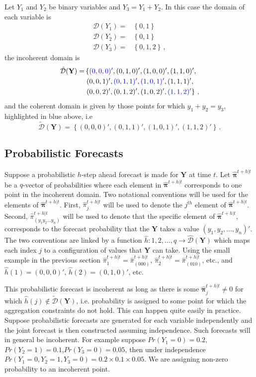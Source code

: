 \documentclass[a4paper,review,12pt,authoryear]{elsarticle}
\newcommand{\bY}{\mathbf{Y}}
\newcommand{\bpi}{\bm{\pi}}
\begin{document}
    Let $Y_1$ and $Y_2$ be binary variables and $Y_3=Y_1+Y_2$. In this case the domain of each variable is
    \begin{align*}
      \mathcal{D}(Y_1)=&\left\{0,1\right\}\\
      \mathcal{D}(Y_2)=&\left\{0,1\right\}\\
      \mathcal{D}(Y_3)=&\left\{0,1,2\right\}\,,
    \end{align*}	
    the incoherent domain is
    \begin{align*}
    \hat{\mathcal D}(\bY)=&\left\{\textcolor{blue}{(0,0,0)'},(0,1,0)',(1,0,0)',(1,1,0)',\right.\\
    &\left.(0,0,1)',\textcolor{blue}{(0,1,1)'},\textcolor{blue}{(1,0,1)'},(1,1,1)',\right.\\
    &\left.(0,0,2)',(0,1,2)',(1,0,2)',\textcolor{blue}{(1,1,2)'}\right\}\,,
    \end{align*}
    and the coherent domain is given by those points for which $y_1+y_2=y_3$, highlighted in blue above, i.e
    \[
        \tilde{\mathcal D}(\bY)=\left\{(0,0,0)',(0,1,1)',(1,0,1)',(1,1,2)'\right\}\,.
    \]
    
    \subsection{Probabilistic Forecasts}

    Suppose a probabilistic $h$-step ahead forecast is made for $\bY$ at time $t$. Let $\hat{\bpi}^{t+h|t}$ be a $q$-vector of probabilities where each element in $\hat{\bpi}^{t+h|t}$ corresponds to one point in the incoherent domain. Two notational conventions will be used for the elements of $\hat{\bpi}^{t+h|t}$. First, $\hat{\pi}_j^{t+h|t}$ will be used to denote the $j^{th}$ element of $\hat{\bpi}^{t+h|t}$.  Second, $\hat{\pi}_{(y_1 y_2 \dots y_n)}^{t+h|t}$ will be used to denote that the specific element of $\hat{\bpi}^{t+h|t}$, corresponds to the forecast probability that the $\bY$ takes a value $(y_1,y_2,\dots,y_n)'$. The two conventions are linked by a function $\hat{h}:{1,2,\dots,q}\rightarrow\hat{\mathcal{D}}(\bY)$ which maps each index $j$ to a configuration of values that $\bY$ can take. Using the small example in the previous section $\hat{\pi}_1^{t+h|t}=\hat{\pi}_{(000)}^{t+h|t}$, $\hat{\pi}_2^{t+h|t}=\hat{\pi}_{(010)}^{t+h|t}$, etc., and $\hat{h}(1)=(0,0,0)'$, $\hat{h}(2)=(0,1,0)'$, etc.
    
    This probabilistic forecast is incoherent as long as there is some $\hat{\bpi}^{t+h|t}_j\neq 0$ for which $\hat{h}(j)\notin\tilde{\mathcal{D}}(\bY)$, i.e. probability is assigned to some point for which the aggregation constraints do not hold. This can happen quite easily in practice. Suppose probabilistic forecasts are generated for each variable independently and the joint forecast is then constructed assuming independence. Such forecasts will in general be incoherent. For example suppose $Pr(Y_1=0)=0.2$,$Pr(Y_2=1)=0.1$,$Pr(Y_3=0)=0.05$, then under independence $Pr(Y_1=0,Y_2=1,Y_3=0)=0.2\times0.1\times0.05$. We are assigning non-zero probability to an incoherent point.
    
\end{document}
